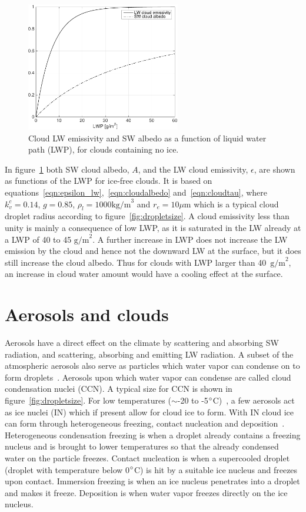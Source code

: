 \begin{figure}
\centering
\includegraphics[width=0.6\textwidth]{theory/eps_alb.pdf}
\caption{Cloud LW emissivity and SW albedo as a function of liquid water path (LWP), for clouds containing no ice.}
\label{fig:epsalb}
\end{figure}

In figure~\ref{fig:epsalb} both SW cloud albedo, $A$, and the LW cloud emissivity, $\epsilon$, are shown as functions of the LWP for ice-free clouds. It is based on equations~\ref{eqn:epsilon_lw},~\ref{eqn:cloudalbedo} and~\ref{eqn:cloudtau}, where $k_v^c=0.14$, $g=0.85$, $\rho_l=1000\text{kg/m}^3$ and $r_e = 10\mu\text{m}$ which is a typical cloud droplet radius according to figure~\ref{fig:dropletsize}. A cloud emissivity less than unity is mainly a consequence of low LWP, as it is saturated in the LW already at a LWP of 40 to 45 $\text{g/m}^2$. A further increase in LWP does not increase the LW emission by the cloud and hence not the downward LW at the surface, but it does still increase the cloud albedo. Thus for clouds with LWP larger than 40~$\text{g/m}^2$, an increase in cloud water amount would have a cooling effect at the surface.

\section{Aerosols and clouds}
Aerosols have a direct effect on the climate by scattering and absorbing SW radiation, and scattering, absorbing and emitting LW radiation. A subset of the atmospheric aerosols also serve as particles which water vapor can condense on to form droplets~\citep{Wallace2006}. Aerosols upon which water vapor can condense are called cloud condensation nuclei (CCN). A typical size for CCN is shown in figure~\ref{fig:dropletsize}. For low temperatures ($\sim$-20 to -5$\degree$C)~\citep{Wallace2006}, a few aerosols act as ice nuclei (IN) which if present allow for cloud ice to form. With IN cloud ice can form through heterogeneous freezing, contact nucleation and deposition~\citep{Wallace2006}. Heterogeneous condensation freezing is when a droplet already contains a freezing nucleus and is brought to lower temperatures so that the already condensed water on the particle freezes. Contact nucleation is when a supercooled droplet (droplet with temperature below 0$\degree$C) is hit by a suitable ice nucleus and freezes upon contact. Immersion freezing is when an ice nucleus penetrates into a droplet and makes it freeze. Deposition is when water vapor freezes directly on the ice nucleus.

